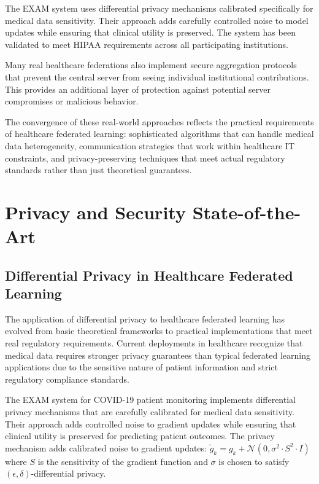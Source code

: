 \documentclass[3p,times,procedia]{elsarticle}
\begin{document}
The EXAM system uses differential privacy mechanisms calibrated specifically for medical data sensitivity. Their approach adds carefully controlled noise to model updates while ensuring that clinical utility is preserved. The system has been validated to meet HIPAA requirements across all participating institutions.

Many real healthcare federations also implement secure aggregation protocols that prevent the central server from seeing individual institutional contributions. This provides an additional layer of protection against potential server compromises or malicious behavior.

The convergence of these real-world approaches reflects the practical requirements of healthcare federated learning: sophisticated algorithms that can handle medical data heterogeneity, communication strategies that work within healthcare IT constraints, and privacy-preserving techniques that meet actual regulatory standards rather than just theoretical guarantees.

\section{Privacy and Security State-of-the-Art}

\subsection{Differential Privacy in Healthcare Federated Learning}

The application of differential privacy to healthcare federated learning has evolved from basic theoretical frameworks to practical implementations that meet real regulatory requirements. Current deployments in healthcare recognize that medical data requires stronger privacy guarantees than typical federated learning applications due to the sensitive nature of patient information and strict regulatory compliance standards.

The EXAM system for COVID-19 patient monitoring implements differential privacy mechanisms that are carefully calibrated for medical data sensitivity. Their approach adds controlled noise to gradient updates while ensuring that clinical utility is preserved for predicting patient outcomes. The privacy mechanism adds calibrated noise to gradient updates:
$\tilde{g}_k = g_k + \mathcal{N}(0, \sigma^2 \cdot S^2 \cdot I)$
where $S$ is the sensitivity of the gradient function and $\sigma$ is chosen to satisfy $(\epsilon, \delta)$-differential privacy.
\end{document}

